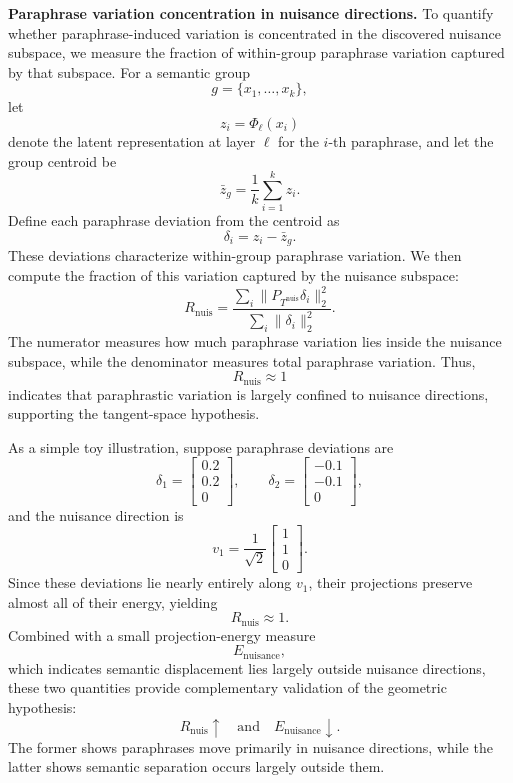 \noindent \textbf{Paraphrase variation concentration in nuisance directions.}
To quantify whether paraphrase-induced variation is concentrated in the discovered nuisance subspace, we measure the fraction of within-group paraphrase variation captured by that subspace. For a semantic group
\[
g=\{x_1,\ldots,x_k\},
\]
let
\[
z_i=\Phi_\ell(x_i)
\]
denote the latent representation at layer $\ell$ for the $i$-th paraphrase, and let the group centroid be
\[
\bar z_g
=
\frac1k
\sum_{i=1}^k z_i.
\]
Define each paraphrase deviation from the centroid as
\[
\delta_i=z_i-\bar z_g.
\]
These deviations characterize within-group paraphrase variation. We then compute the fraction of this variation captured by the nuisance subspace:
\[
R_{\mathrm{nuis}}
=
\frac{
\sum_i
\|P_{T^{\mathrm{nuis}}}\delta_i\|_2^2
}{
\sum_i
\|\delta_i\|_2^2
}.
\]
The numerator measures how much paraphrase variation lies inside the nuisance subspace, while the denominator measures total paraphrase variation. Thus,
\[
R_{\mathrm{nuis}}\approx 1
\]
indicates that paraphrastic variation is largely confined to nuisance directions, supporting the tangent-space hypothesis.

As a simple toy illustration, suppose paraphrase deviations are
\[
\delta_1=
\begin{bmatrix}
0.2\\
0.2\\
0
\end{bmatrix},
\qquad
\delta_2=
\begin{bmatrix}
-0.1\\
-0.1\\
0
\end{bmatrix},
\]
and the nuisance direction is
\[
v_1=
\frac1{\sqrt2}
\begin{bmatrix}
1\\
1\\
0
\end{bmatrix}.
\]
Since these deviations lie nearly entirely along $v_1$, their projections preserve almost all of their energy, yielding
\[
R_{\mathrm{nuis}}\approx 1.
\]
Combined with a small projection-energy measure
\[
E_{\mathrm{nuisance}},
\]
which indicates semantic displacement lies largely outside nuisance directions, these two quantities provide complementary validation of the geometric hypothesis:
\[
R_{\mathrm{nuis}}\uparrow
\quad\text{and}\quad
E_{\mathrm{nuisance}}\downarrow.
\]
The former shows paraphrases move primarily in nuisance directions, while the latter shows semantic separation occurs largely outside them.

